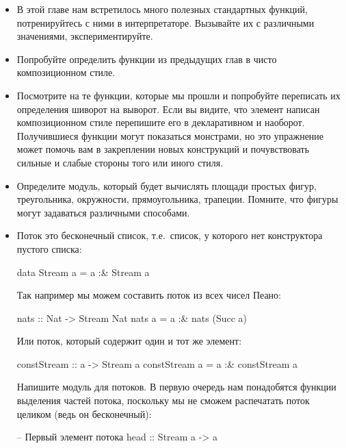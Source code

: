 \begin{itemize}

\item В этой главе нам встретилось много полезных 
        стандартных функций, потренируйтесь с ними
        в интерпретаторе. Вызывайте их с различными значениями,
        экспериментируйте.


\item Попробуйте определить функции из предыдущих глав
        в чисто композиционном стиле. 

\item Посмотрите на те функции, которые мы прошли 
        и попробуйте переписать их определения шиворот на
        выворот. Если вы видите, что элемент написан композиционном
        стиле перепишите его в декларативном и наоборот.
        Получившиеся функции могут показаться монстрами, но
        это упражнение может помочь вам в закреплении новых 
        конструкций и почувствовать сильные и слабые стороны
        того или иного стиля.

\item Определите модуль, который будет вычислять площади 
        простых фигур, треугольника, окружности, прямоугольника,
        трапеции. Помните, что фигуры могут задаваться различными
        способами.

\item Поток это бесконечный список, т.е.~список, у которого
        нет конструктора пустого списка:

\begin{code}
data Stream a = a :& Stream a
\end{code}

Так например мы можем составить поток из всех чисел Пеано:

\begin{code}
nats :: Nat -> Stream Nat
nats a = a :& nats (Succ a) 
\end{code}

Или поток, который содержит один и тот же элемент:

\begin{code}
constStream :: a -> Stream a
constStream a = a :& constStream a 
\end{code}

Напишите модуль для потоков. В первую очередь нам понадобятся
функции выделения частей потока, поскольку мы не сможем
распечатать поток целиком (ведь он бесконечный):

\begin{code}
-- Первый элемент потока
head :: Stream a -> a


\end{code}
\end{itemize}
